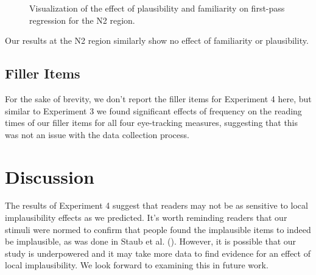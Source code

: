 \documentclass[
  letterpaper,
  DIV=11,
  numbers=noendperiod,
  nottoc]{scrreprt}
\begin{document}
\begin{figure}[htbp]


\caption{\label{fig-firstpassn2staub}Visualization of the effect of
plausibility and familiarity on first-pass regression for the N2
region.}

\end{figure}%

Our results at the N2 region similarly show no effect of familiarity or
plausibility.

\subsection{Filler Items}\label{filler-items-1}

For the sake of brevity, we don't report the filler items for Experiment
4 here, but similar to Experiment 3 we found significant effects of
frequency on the reading times of our filler items for all four
eye-tracking measures, suggesting that this was not an issue with the
data collection process.

\section{Discussion}\label{discussion-1}

The results of Experiment 4 suggest that readers may not be as sensitive
to local implausibility effects as we predicted. It's worth reminding
readers that our stimuli were normed to confirm that people found the
implausible items to indeed be implausible, as was done in Staub et al.
(). However, it is
possible that our study is underpowered and it may take more data to
find evidence for an effect of local implausibility. We look forward to
examining this in future work.
\end{document}

